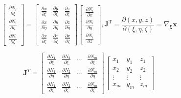 \begin{equation}
\left[ {\begin{array}{c}
  {\frac{{\partial {N_i}}}{{\partial \xi }}} \\ 
  {\frac{{\partial {N_i}}}{{\partial \eta }}} \\ 
  {\frac{{\partial {N_i}}}{{\partial \zeta }}} 
\end{array}} \right] = \left[ {\begin{array}{ccc}
  {\frac{{\partial x}}{{\partial \xi }}}&{\frac{{\partial y}}{{\partial \xi }}}&{\frac{{\partial z}}{{\partial \xi }}} \\ 
  {\frac{{\partial x}}{{\partial \eta }}}&{\frac{{\partial y}}{{\partial \eta }}}&{\frac{{\partial z}}{{\partial \eta }}} \\ 
  {\frac{{\partial x}}{{\partial \zeta }}}&{\frac{{\partial x}}{{\partial \zeta }}}&{\frac{{\partial x}}{{\partial \zeta }}} 
\end{array}} \right]\left[ {\begin{array}{c}
  {\frac{{\partial {N_i}}}{{\partial x}}} \\ 
  {\frac{{\partial {N_i}}}{{\partial y}}} \\ 
  {\frac{{\partial {N_i}}}{{\partial z}}} 
\end{array}} \right], { {\bm{J}}^{\text{T}}} = \frac{{\partial \left( {x,y,z} \right)}} {{\partial \left( {\xi ,\eta ,\zeta } \right)}} = {\nabla _{\bm{\xi}} } {\bm{x}}
\end{equation}

\begin{equation}
{{\bm{J}}^T} = \left[ {\begin{array}{cccc}
  {\frac{{\partial {N_1}}}{{\partial \xi }}}&{\frac{{\partial {N_2}}}{{\partial \xi }}}& \cdots &{\frac{{\partial {N_m}}}{{\partial \xi }}} \\ 
  {\frac{{\partial {N_1}}}{{\partial \eta }}}&{\frac{{\partial {N_2}}}{{\partial \eta }}}& \cdots &{\frac{{\partial {N_m}}}{{\partial \eta }}} \\ 
  {\frac{{\partial {N_1}}}{{\partial \zeta }}}&{\frac{{\partial {N_2}}}{{\partial \zeta }}}& \cdots &{\frac{{\partial {N_m}}}{{\partial \zeta }}} 
\end{array}} \right]\left[ {\begin{array}{ccc}
  {{x_1}}&{{y_1}}&{{z_1}} \\ 
  {{x_2}}&{{y_2}}&{{z_2}} \\ 
   \vdots & \vdots & \vdots  \\ 
  {{x_m}}&{{y_m}}&{{z_m}} 
\end{array}} \right]
\end{equation}


